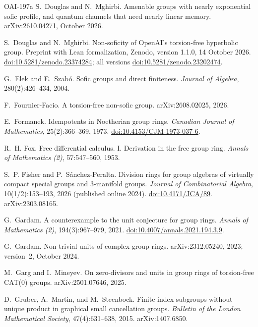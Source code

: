 \documentclass[11pt]{article}
\theoremstyle{definition}
\theoremstyle{plain}
\newcommand{\doi}[1]{\href{https://doi.org/#1}{doi:#1}}
\begin{document}
\begin{thebibliography}{OAI-197a}
S.~Douglas and N.~Mghirbi.
\newblock Amenable groups with nearly exponential sofic profile, and quantum channels that need nearly linear memory.
\newblock arXiv:2610.04271, October 2026.

S.~Douglas and N.~Mghirbi.
\newblock Non-soficity of OpenAI's torsion-free hyperbolic group.
\newblock Preprint with Lean formalization, Zenodo, version 1.1.0, 14 October 2026. \doi{10.5281/zenodo.23374284}; all versions \doi{10.5281/zenodo.23202474}.

G.~Elek and E.~Szab\'o.
\newblock Sofic groups and direct finiteness.
\newblock \emph{Journal of Algebra}, 280(2):426--434, 2004.

F.~Fournier-Facio.
\newblock A torsion-free non-sofic group.
\newblock arXiv:2608.02025, 2026.

E.~Formanek.
\newblock Idempotents in Noetherian group rings.
\newblock \emph{Canadian Journal of Mathematics}, 25(2):366--369, 1973. \doi{10.4153/CJM-1973-037-6}.

R.~H. Fox.
\newblock Free differential calculus. I. Derivation in the free group ring.
\newblock \emph{Annals of Mathematics (2)}, 57:547--560, 1953.

S.~P. Fisher and P.~S\'anchez-Peralta.
\newblock Division rings for group algebras of virtually compact special groups and $3$-manifold groups.
\newblock \emph{Journal of Combinatorial Algebra}, 10(1/2):153--193, 2026 (published online 2024). \doi{10.4171/JCA/89}. arXiv:2303.08165.

G.~Gardam.
\newblock A counterexample to the unit conjecture for group rings.
\newblock \emph{Annals of Mathematics (2)}, 194(3):967--979, 2021. \doi{10.4007/annals.2021.194.3.9}.

G.~Gardam.
\newblock Non-trivial units of complex group rings.
\newblock arXiv:2312.05240, 2023; version~2, October 2024.

M.~Garg and I.~Mineyev.
\newblock On zero-divisors and units in group rings of torsion-free CAT(0) groups.
\newblock arXiv:2501.07646, 2025.

D.~Gruber, A.~Martin, and M.~Steenbock.
\newblock Finite index subgroups without unique product in graphical small cancellation groups.
\newblock \emph{Bulletin of the London Mathematical Society}, 47(4):631--638, 2015. arXiv:1407.6850.


\end{thebibliography}
\end{document}
